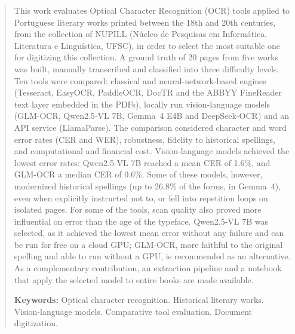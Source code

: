 \documentclass[noabntexcite,oneside]{ufsc-thesis-rn46-2019}
\begin{document}
\begin{abstract}

This work evaluates Optical Character Recognition (OCR) tools applied to Portuguese
literary works printed between the 18th and 20th centuries, from the collection of NUPILL
(Núcleo de Pesquisas em Informática, Literatura e Linguística, UFSC), in order to select
the most suitable one for digitizing this collection. A ground truth of 20 pages from five
works was built, manually transcribed and classified into three difficulty
levels. Ten tools were compared: classical and neural-network-based engines (Tesseract,
EasyOCR, PaddleOCR, DocTR and the ABBYY FineReader text layer embedded in the PDFs),
locally run vision-language models (GLM-OCR, Qwen2.5-VL 7B, Gemma~4 E4B and DeepSeek-OCR)
and an API service (LlamaParse). The comparison considered character and
word error rates (CER and WER), robustness, fidelity to historical spellings, and
computational and financial cost. Vision-language models achieved the lowest error rates:
Qwen2.5-VL 7B reached a mean CER of 1.6\%, and GLM-OCR a median CER of 0.6\%. Some of these
models, however, modernized historical spellings (up to 26.8\% of the forms, in Gemma~4),
even when explicitly instructed not to, or fell into repetition loops on isolated pages.
For some of the tools, scan quality also proved more influential on error than the age of
the typeface. Qwen2.5-VL 7B was selected, as it achieved the
lowest mean error without any failure and can be run for free on a cloud GPU; GLM-OCR, more
faithful to the original spelling and able to run without a GPU, is recommended as an
alternative. As a complementary contribution, an extraction pipeline and a notebook that apply the selected
model to entire books are made available.

\vspace{\baselineskip}
\textbf{Keywords:} Optical character recognition. Historical literary works.
Vision-language models. Comparative tool evaluation. Document digitization.

\end{abstract}


\listoffigures*
\cleardoublepage
\end{document}
